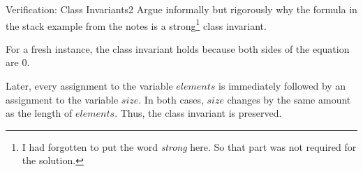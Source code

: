 \documentclass[a4paper]{article}
\begin{document}
\header

\begin{problem}{Verification: Class Invariants}{2}
Argue informally but rigorously why the formula in the stack example from the notes is a strong\footnote{I had forgotten to put the word \emph{strong} here. So that part was not required for the solution.} class invariant.

\begin{solution}
For a fresh instance, the class invariant holds because both sides of the equation are $0$.

Later, every assignment to the variable $elements$ is immediately followed by an assignment to the variable $size$.
In both cases, $size$ changes by the same amount as the length of $elements$.
Thus, the class invariant is preserved.
\end{solution}
\end{problem}
\end{document}
